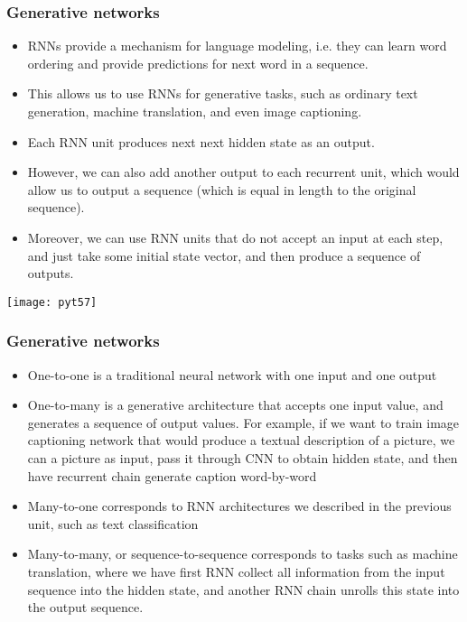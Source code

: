 \begin{frame}[fragile] \frametitle{Generative networks}

\begin{itemize}
\item RNNs provide a mechanism for language modeling, i.e. they can learn word ordering and provide predictions for next word in a sequence.
\item This allows us to use RNNs for generative tasks, such as ordinary text generation, machine translation, and even image captioning.
\item Each RNN unit produces next next hidden state as an output. 
\item However, we can also add another output to each recurrent unit, which would allow us to output a sequence (which is equal in length to the original sequence). \item Moreover, we can use RNN units that do not accept an input at each step, and just take some initial state vector, and then produce a sequence of outputs.
\end{itemize}

\begin{center}
\texttt{[image: pyt57]}
\end{center}

\end{frame}

\begin{frame}[fragile] \frametitle{Generative networks}

\begin{itemize}
\item One-to-one is a traditional neural network with one input and one output
\item One-to-many is a generative architecture that accepts one input value, and generates a sequence of output values. For example, if we want to train image captioning network that would produce a textual description of a picture, we can a picture as input, pass it through CNN to obtain hidden state, and then have recurrent chain generate caption word-by-word
\item Many-to-one corresponds to RNN architectures we described in the previous unit, such as text classification
\item Many-to-many, or sequence-to-sequence corresponds to tasks such as machine translation, where we have first RNN collect all information from the input sequence into the hidden state, and another RNN chain unrolls this state into the output sequence.
\end{itemize}

\end{frame}

